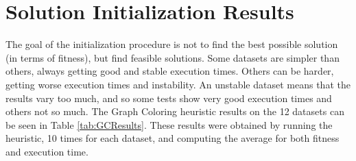 \section{Solution Initialization Results}
\label{sec:SolutionInitResults}
The goal of the initialization procedure is not to find the best possible solution (in terms of fitness), but find feasible solutions. Some datasets are simpler than others, always getting good and stable execution times. Others can be harder, getting worse execution times and instability. An unstable dataset means that the results vary too much, and so some tests show very good execution times and others not so much. The Graph Coloring heuristic results on the 12 datasets can be seen in Table \ref{tab:GCResults}. These results were obtained by running the heuristic, 10 times for each dataset, and computing the average for both fitness and execution time.\\
\\
